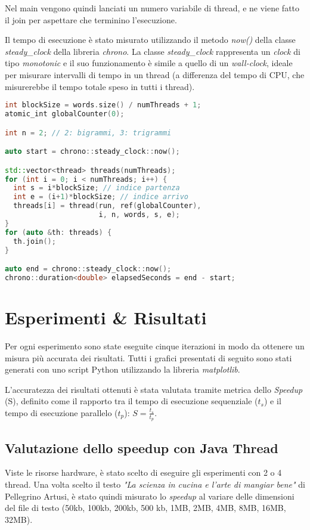 \documentclass[10pt,twocolumn,letterpaper]{article}
\begin{document}
Nel main vengono quindi lanciati un numero variabile di thread, e ne viene fatto il join per aspettare che terminino l’esecuzione.

Il tempo di esecuzione è stato misurato utilizzando il metodo \textit{now()} della classe \textit{steady\_clock} della libreria \textit{chrono}. La classe \textit{steady\_clock} rappresenta un \textit{clock} di tipo \textit{monotonic} e il suo funzionamento è simile a quello di un \textit{wall-clock}, ideale per misurare intervalli di tempo in un thread (a differenza del tempo di CPU, che misurerebbe il tempo totale speso in tutti i thread).
\newpage

\begin{lstlisting}[basicstyle=\scriptsize, language=C++, frame=single, caption={Lancio di C++ Thread per la ricerca di bigrammi/trigrammi},captionpos=b,showstringspaces=false]
int blockSize = words.size() / numThreads + 1;
atomic_int globalCounter(0);

int n = 2; // 2: bigrammi, 3: trigrammi

auto start = chrono::steady_clock::now();

std::vector<thread> threads(numThreads);
for (int i = 0; i < numThreads; i++) {
  int s = i*blockSize; // indice partenza
  int e = (i+1)*blockSize; // indice arrivo
  threads[i] = thread(run, ref(globalCounter), 
                      i, n, words, s, e);
}
for (auto &th: threads) {
  th.join();
}

auto end = chrono::steady_clock::now();
chrono::duration<double> elapsedSeconds = end - start;
\end{lstlisting}

\section{Esperimenti \& Risultati}
Per ogni esperimento sono state eseguite cinque iterazioni in modo da ottenere un misura più accurata dei risultati.
Tutti i grafici presentati di seguito sono stati generati con uno script Python utilizzando la libreria \textit{matplotlib}.

L’accuratezza dei risultati ottenuti è stata valutata tramite metrica dello \textit{Speedup} (S), definito come il rapporto tra il tempo di esecuzione sequenziale ($t_s$) e il tempo di esecuzione parallelo ($t_p$): $S = \frac{t_s}{t_p}$.

\subsection{Valutazione dello speedup con Java Thread}
Viste le risorse hardware, è stato scelto di eseguire gli esperimenti con 2 o 4 thread.
Una volta scelto il testo \textit{"La scienza in cucina e l'arte di mangiar bene"} di Pellegrino Artusi, è stato quindi misurato lo \textit{speedup} al variare delle dimensioni del file di testo (50kb, 100kb, 200kb, 500 kb, 1MB, 2MB, 4MB, 8MB, 16MB, 32MB).
\end{document}
